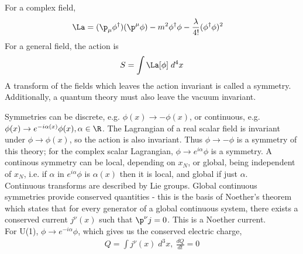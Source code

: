 \documentclass[relqm.tex]{subfiles}
\begin{document}
For a complex field,
\begin{align}
    \La &= (\p_\mu\phi^\dagger)(\p^\mu\phi) - m^2\phi^\dagger\phi - \frac{\lambda}{4!}(\phi^\dagger\phi)^2
\end{align}
For a general field, the action is
\begin{align}
    S = \int \La[\phi]\;d^4x
\end{align}
A transform of the fields which leaves the action invariant is called a symmetry. 
Additionally, a quantum theory must also leave the vacuum invariant. 

Symmetries can be discrete, e.g. $\phi(x)\to-\phi(x)$, or continuous, e.g. $\phi(x)\to e^{-i\alpha(x)}\phi(x),\alpha\in\R$.
The Lagrangian of a real scalar field is invariant under $\phi\to\phi(x)$, so the action is also invariant. 
Thus $\phi\to-\phi$ is a symmetry of this theory; for the complex scalar Lagrangian, $\phi\to e^{i\alpha}\phi$ is a symmetry. 
A continous symmetry can be local, depending on $x_N$, or global, being independent of $x_N$, i.e. if $\alpha$ in $e^{i\alpha}\phi$ is $\alpha(x)$ then it is local, and global if just $\alpha$.\\
Continuous transforms are described by Lie groups. 
Global continuous symmetries provide conserved quantities - this is the basis of Noether's theorem which states that for every generator of a global continuous system, there exists a conserved current $j^\nu(x)$ such that $\p^\nu j = 0$.
This is a Noether current. \\
For U(1), $\phi\to e^{-i\alpha}\phi$, which gives us the conserved electric charge, 
\begin{align}
    Q = \int j^\nu(x)\;d^3x,~ \frac{dQ}{dt} = 0
\end{align}
\end{document}
